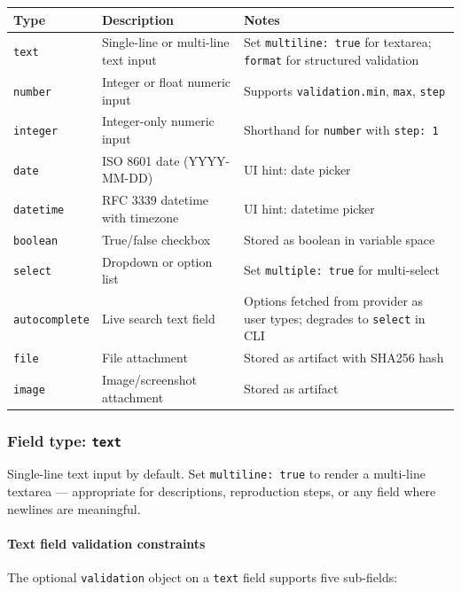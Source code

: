 \begin{center}
\begin{tabular}{lp{4.5cm}p{4.5cm}}
\hline
\textbf{Type} & \textbf{Description} & \textbf{Notes} \\
\hline
\texttt{text}         & Single-line or multi-line text input & Set \texttt{multiline: true} for textarea; \texttt{format} for structured validation \\
\texttt{number}       & Integer or float numeric input & Supports \texttt{validation.min}, \texttt{max}, \texttt{step} \\
\texttt{integer}      & Integer-only numeric input & Shorthand for \texttt{number} with \texttt{step: 1} \\
\texttt{date}         & ISO 8601 date (YYYY-MM-DD) & UI hint: date picker \\
\texttt{datetime}     & RFC 3339 datetime with timezone & UI hint: datetime picker \\
\texttt{boolean}      & True/false checkbox & Stored as boolean in variable space \\
\texttt{select}       & Dropdown or option list & Set \texttt{multiple: true} for multi-select \\
\texttt{autocomplete} & Live search text field & Options fetched from provider as user types; degrades to \texttt{select} in CLI \\
\texttt{file}         & File attachment & Stored as artifact with SHA256 hash \\
\texttt{image}        & Image/screenshot attachment & Stored as artifact \\
\hline
\end{tabular}
\end{center}

\subsubsection{Field type: \texttt{text}}
\label{subsubsec:field-text}

Single-line text input by default.  Set \texttt{multiline: true} to render a
multi-line textarea — appropriate for descriptions, reproduction steps, or
any field where newlines are meaningful.

\paragraph{Text field validation constraints}

The optional \texttt{validation} object on a \texttt{text} field supports five
sub-fields:

